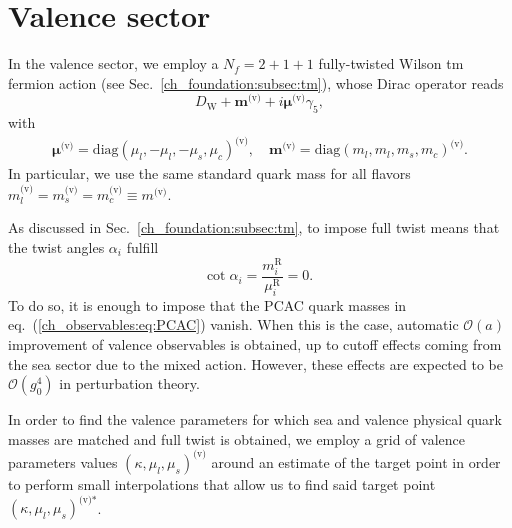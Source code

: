 

\section{Valence sector}
\label{ch_ma:sec:Valence}

In the valence sector, we employ a $N_f=2+1+1$ fully-twisted Wilson tm fermion action (see Sec.~\ref{ch_foundation:subsec:tm}), whose Dirac operator reads
\begin{equation}
D_{\textrm{W}}+\boldsymbol{m}^{\textrm{(v)}}+i\boldsymbol{\mu}^{\textrm{(v)}}\gamma_5,
\end{equation}
with 
\begin{gather}
\boldsymbol{\mu}^{\textrm{(v)}}={\textrm{diag}}(\mu_l,-\mu_l,-\mu_s,\mu_c)^{\textrm{(v)}}, \quad
\boldsymbol{m}^{\textrm{(v)}}={\textrm{diag}}(m_l,m_l,m_s,m_c)^{\textrm{(v)}}.
\end{gather}
In particular, we use the same standard quark mass for all flavors $m_l^{\textrm{(v)}}=m_s^{\textrm{(v)}}=m_c^{\textrm{(v)}}\equiv m^{\textrm{(v)}}$.

As discussed in Sec.~\ref{ch_foundation:subsec:tm}, to impose full twist means that the twist angles $\alpha_i$ fulfill
\begin{equation}
{\textrm{cot}}\;\alpha_i=\frac{m_i^{\textrm{R}}}{\mu_i^{\textrm{R}}}=0.
\end{equation}
To do so, it is enough to impose that the PCAC quark masses in eq.~(\ref{ch_observables:eq:PCAC}) vanish. When this is the case, automatic $\mathcal{O}(a)$ improvement of valence observables is obtained, up to cutoff effects coming from the sea sector due to the mixed action. However, these effects are expected to be $\mathcal{O}(g_0^4)$ in perturbation theory.

In order to find the valence parameters for which sea and valence physical quark masses are matched and full twist is obtained, we employ a grid of valence parameters values $\left(\kappa,\mu_l,\mu_s\right)^{\textrm{(v)}}$ around an estimate of the target point in order to perform small interpolations that allow us to find said target point $\left(\kappa,\mu_l,\mu_s\right)^{\textrm{(v)*}}$.


